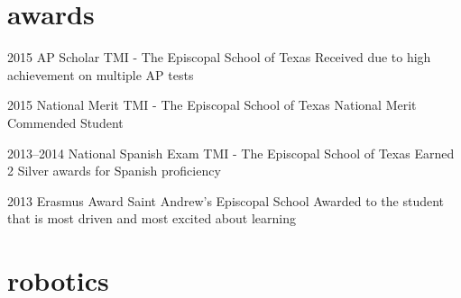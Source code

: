 \documentclass[]{friggeri-cv} %
\begin{document}
\section{awards}

\begin{entrylist}

	\entry
	{2015}
	{AP Scholar}
	{TMI - The Episcopal School of Texas}
	{Received due to high achievement on multiple AP tests}


	\entry
	{2015}
	{National Merit}
	{TMI - The Episcopal School of Texas}
	{National Merit Commended Student}


	\entry
	{2013--2014}
	{National Spanish Exam}
	{TMI - The Episcopal School of Texas}
	{Earned 2 Silver awards for Spanish proficiency}


	\entry
	{2013}
	{Erasmus Award}
	{Saint Andrew's Episcopal School}
	{Awarded to the student that is most driven and most excited about learning}

\end{entrylist}


\section{robotics}
\end{document}
